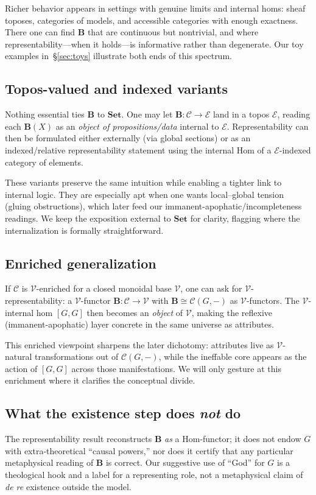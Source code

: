 \documentclass[11pt]{article}
\theoremstyle{upright}
\begin{document}
Richer behavior appears in settings with genuine limits and internal homs: sheaf toposes, categories of models, and accessible categories with enough exactness. There one can find \(\mathbf B\) that are continuous but nontrivial, and where representability---when it holds---is informative rather than degenerate. Our toy examples in~\S\ref{sec:toys} illustrate both ends of this spectrum.

\subsection{Topos-valued and indexed variants}
Nothing essential ties \(\mathbf B\) to \(\mathbf{Set}\). One may let \(\mathbf B:\mathcal C\to\mathcal E\) land in a topos \(\mathcal E\), reading each \(\mathbf B(X)\) as an \emph{object of propositions/data} internal to \(\mathcal E\). Representability can then be formulated either externally (via global sections) or as an indexed/relative representability statement using the internal Hom of a \(\mathcal E\)-indexed category of elements.

These variants preserve the same intuition while enabling a tighter link to internal logic. They are especially apt when one wants local--global tension (gluing obstructions), which later feed our immanent-apophatic/incompleteness readings. We keep the exposition external to \(\mathbf{Set}\) for clarity, flagging where the internalization is formally straightforward.

\subsection{Enriched generalization}
If \(\mathcal C\) is \(\mathcal V\)-enriched for a closed monoidal base \(\mathcal V\), one can ask for \(\mathcal V\)-representability: a \(\mathcal V\)-functor \(\mathbf B:\mathcal C\to\mathcal V\) with \(\mathbf B\cong \mathcal C(G,-)\) as \(\mathcal V\)-functors. \citep{Kelly1982} The \(\mathcal V\)-internal hom \([G,G]\) then becomes an \emph{object} of \(\mathcal V\), making the reflexive (immanent-apophatic) layer concrete in the same universe as attributes. 

This enriched viewpoint sharpens the later dichotomy: attributes live as \(\mathcal V\)-natural transformations out of \(\mathcal C(G,-)\), while the ineffable core appears as the action of \([G,G]\) across those manifestations. We will only gesture at this enrichment where it clarifies the conceptual divide.

\subsection{What the existence step does \emph{not} do}
The representability result reconstructs \(\mathbf B\) \emph{as} a Hom-functor; it does not endow \(G\) with extra-theoretical ``causal powers,'' nor does it certify that any particular metaphysical reading of \(\mathbf B\) is correct. Our suggestive use of ``God'' for \(G\) is a theological hook and a  label for a representing role, not a metaphysical claim of \emph{de re} existence outside the model.
\end{document}
